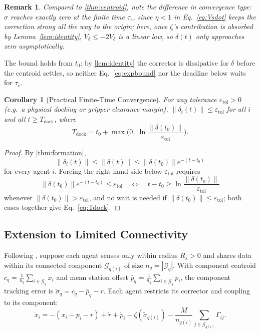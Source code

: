 \documentclass[letterpaper, 10 pt, conference]{ieeeconf}
\newcommand{\norm}[1]{\left\lVert #1 \right\rVert}
\newcommand{\abs}[1]{\left\lvert #1 \right\rvert}
\newtheorem{corollary}{Corollary}
\newtheorem{remark}{Remark}
\begin{document}
\begin{remark}
Compared to \cref{thm:centroid}, note the difference in
convergence type: $\sigma$ reaches exactly zero at the finite time
$\tau_c$, since $\eta<1$ in Eq.~\eqref{eq:Vsdot} keeps the correction
strong all the way to the origin; here, once $\zeta$'s contribution
is absorbed by Lemma~\ref{lem:identity}, $\dot V_\delta\le-2V_\delta$
is a linear law, so $\delta(t)$ only approaches zero asymptotically.
\end{remark}

The bound holds from $t_0$: by \cref{lem:identity} the corrector is
dissipative for $\delta$ before the centroid settles, so neither
Eq.~\eqref{eq:expbound} nor the deadline below waits for $\tau_c$.

\begin{corollary}[Practical Finite-Time Convergence]
\label{cor:dock}
For any tolerance $\varepsilon_{\mathrm{tol}}>0$ (e.g.\ a physical
docking or gripper clearance margin),
$\norm{\delta_i(t)}\le\varepsilon_{\mathrm{tol}}$ for all $i$ and all
$t\ge T_{\mathrm{dock}}$, where
\begin{equation}
T_{\mathrm{dock}}=t_0+\max\!\Big(0,\ \ln\frac{\norm{\delta(t_0)}}{\varepsilon_{\mathrm{tol}}}\Big).
\label{eq:Tdock}
\end{equation}
\end{corollary}
\begin{proof}
By \cref{thm:formation},
\[
\norm{\delta_i(t)} \le \norm{\delta(t)} \le \norm{\delta(t_0)}e^{-(t-t_0)}
\]
for every agent $i$. Forcing the right-hand side below
$\varepsilon_{\mathrm{tol}}$ requires
\[
\norm{\delta(t_0)}e^{-(t-t_0)} \le \varepsilon_{\mathrm{tol}}
\quad\Longleftrightarrow\quad
t-t_0 \ge \ln\frac{\norm{\delta(t_0)}}{\varepsilon_{\mathrm{tol}}}
\]
whenever $\norm{\delta(t_0)}>\varepsilon_{\mathrm{tol}}$, and no wait
is needed if $\norm{\delta(t_0)}\le\varepsilon_{\mathrm{tol}}$; both
cases together give Eq.~\eqref{eq:Tdock}.
\end{proof}

\subsection{Extension to Limited Connectivity}
\label{sec:connectivity}

Following \cite[Sec.~V-A]{fedele2019kinematic}, suppose each agent senses only within radius $R_s>0$ and shares data within its connected component $\mathcal G_{q(i)}$ of size $n_q = \abs{\mathcal G_q}$. With component centroid $c_q = \frac{1}{n_q}\sum_{i\in\mathcal G_q}x_i$ and mean station offset $\bar p_q = \frac{1}{n_q}\sum_{i\in\mathcal G_q}p_i$, the component tracking error is $\tilde\sigma_q = c_q - \bar p_q - r$. Each agent restricts its corrector and coupling to its component:
\begin{equation}
\dot x_i = -(x_i-p_i-r) + \dot r + \dot p_i - \zeta(\tilde\sigma_{q(i)}) - \frac{M}{n_{q(i)}}\!\sum_{j\in\mathcal G_{q(i)}}\!\Gamma_{ij}.
\label{eq:model_conn}
\end{equation}
\end{document}
